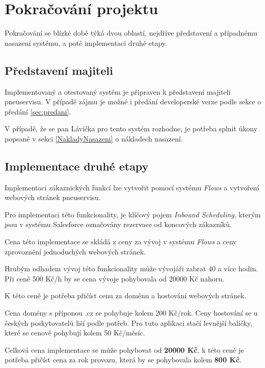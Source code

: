 \section{Pokračování projektu}
Pokračování se blízké době týká dvou oblastí, nejdříve představení a případnému nasazení systému, a poté implementaci druhé etapy.
\subsection{Představení majiteli}
Implementovaný a otestovaný systém je připraven k představení majiteli pneuservisu. V případě zájmu je možné i předání developerské verze podle sekce o předání \ref{sec:predani}.

V případě, že se pan Lávička pro tento systém rozhodne, je potřeba splnit úkony popsané v sekci \ref{NakladyNasazeni} o nákladech nasazení.
\subsection{Implementace druhé etapy} \label{subsec:implementace_druhe_etapy}
Implementaci zákaznických funkcí lze vytvořit pomocí systému \emph{Flows} a vytvoření webových stránek pneuservisu.

Pro implementaci této funkcionality, je klíčový pojem \emph{Inbound Scheduling}, kterým jsou v systému Salesforce označovány rezervace od koncových zákazníků. \cite{SalesforceInboundScheduling}

Cena této implementace se skládá z ceny za vývoj v systému \emph{Flows} a ceny zprovoznění jednoduchých webových stránek.

Hrubým odhadem vývoj této funkcionality může vývojáři zabrat 40 a více hodin. Při ceně 500 Kč/h by se cena vývoje pohybovala od 20000 Kč nahoru.

K této ceně je potřeba přičíst cenu za doménu a hostování webových stránek. 

Cena domény s příponou .cz se pohybuje kolem 200 Kč/rok. Ceny hostování se u českých poskytovatelů liší podle potřeb. Pro tuto aplikaci stačí levnější balíčky, které se cenově pohybují kolem 50 Kč/měsíc. \cite{web4uDomeny}\cite{web4uHosting}\cite{wedosInternet}

Celková cena implementace se může pohybovat od \textbf{20000 Kč}, k této ceně je potřeba přičíst cena za rok provozu, která by se pohybovala kolem \textbf{800 Kč}.
